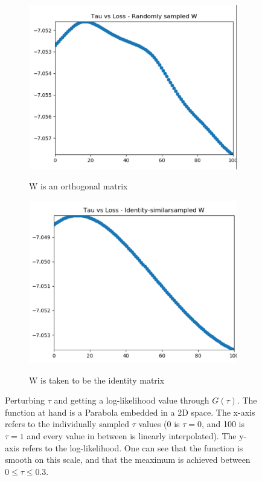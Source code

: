 \begin{figure}[H]
    \centering
    \begin{subfigure}[b]{0.40\textwidth}
        \includegraphics[width=\textwidth]{Appendix1/tau_0}
        \label{fig:gull}
        \caption{W is an orthogonal matrix}
    \end{subfigure}
    \quad
    \begin{subfigure}[b]{0.40\textwidth}
        \includegraphics[width=\textwidth]{Appendix1/tau_1}
        \label{fig:tiger}
        \caption{W is taken to be the identity matrix}
    \end{subfigure}   
           \caption{Perturbing $\tau$ and getting a log-likelihood value through $G(\tau)$.
           The function at hand is a Parabola embedded in a 2D space.
           The x-axis refers to the individually sampled $\tau$ values (0 is $\tau = 0$, and 100 is $\tau = 1$ and every value in between is linearly interpolated).
           The y-axis refers to the log-likelihood.
           One can see that the function is smooth on this scale, and that the meaximum is achieved between $0 \leq \tau \leq 0.3 $. }
\end{figure}


